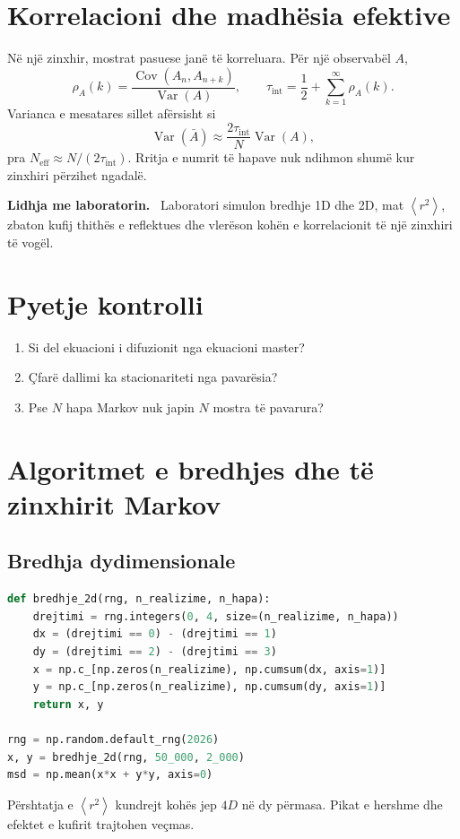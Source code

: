\documentclass[11pt,oneside,openany]{book}
\newcommand{\Var}{\operatorname{Var}}
\newcommand{\Cov}{\operatorname{Cov}}
\newcommand{\avg}[1]{\left\langle #1\right\rangle}
\newenvironment{lidhje}{\par\medskip\noindent\textbf{Lidhja me laboratorin.}\ }{\par\medskip}
\begin{document}
\section{Korrelacioni dhe madhësia efektive}
Në një zinxhir, mostrat pasuese janë të korreluara. Për një observabël $A$,
\begin{equation}
 \rho_A(k)=\frac{\Cov(A_n,A_{n+k})}{\Var(A)},\qquad
 \tau_{\mathrm{int}}=\frac12+\sum_{k=1}^{\infty}\rho_A(k).
\end{equation}
Varianca e mesatares sillet afërsisht si
\begin{equation}
 \Var(\bar A)\approx\frac{2\tau_{\mathrm{int}}}{N}\Var(A),
\end{equation}
pra $N_{\mathrm{eff}}\approx N/(2\tau_{\mathrm{int}})$. Rritja e numrit të hapave nuk ndihmon shumë kur zinxhiri përzihet ngadalë.

\begin{lidhje}
Laboratori simulon bredhje 1D dhe 2D, mat $\avg{r^2}$, zbaton kufij thithës e reflektues dhe vlerëson kohën e korrelacionit të një zinxhiri të vogël.
\end{lidhje}

\section*{Pyetje kontrolli}
\begin{enumerate}
\item Si del ekuacioni i difuzionit nga ekuacioni master?
\item Çfarë dallimi ka stacionariteti nga pavarësia?
\item Pse $N$ hapa Markov nuk japin $N$ mostra të pavarura?
\end{enumerate}

\section{Algoritmet e bredhjes dhe të zinxhirit Markov}
\subsection{Bredhja dydimensionale}
\begin{lstlisting}[language=Python,caption={Shumë realizime të bredhjes në 2D.}]
def bredhje_2d(rng, n_realizime, n_hapa):
    drejtimi = rng.integers(0, 4, size=(n_realizime, n_hapa))
    dx = (drejtimi == 0) - (drejtimi == 1)
    dy = (drejtimi == 2) - (drejtimi == 3)
    x = np.c_[np.zeros(n_realizime), np.cumsum(dx, axis=1)]
    y = np.c_[np.zeros(n_realizime), np.cumsum(dy, axis=1)]
    return x, y

rng = np.random.default_rng(2026)
x, y = bredhje_2d(rng, 50_000, 2_000)
msd = np.mean(x*x + y*y, axis=0)
\end{lstlisting}
Përshtatja e $\avg{r^2}$ kundrejt kohës jep $4D$ në dy përmasa. Pikat e hershme dhe efektet e kufirit trajtohen veçmas.
\end{document}
